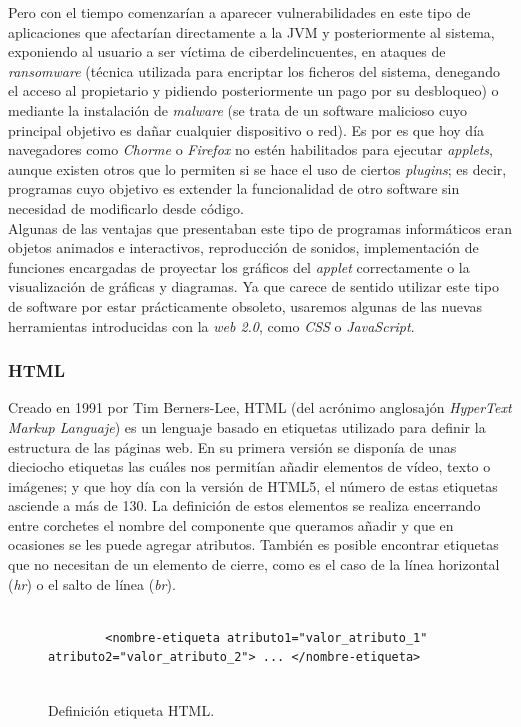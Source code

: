 \documentclass[../main.tex]{subfiles}
\begin{document}
    Pero con el tiempo comenzarían a aparecer vulnerabilidades en este tipo de aplicaciones que afectarían directamente a la JVM y posteriormente al sistema, exponiendo al usuario a ser víctima de ciberdelincuentes, en ataques de \textit{ransomware} (técnica utilizada para encriptar los ficheros del sistema, denegando el acceso al propietario y pidiendo posteriormente un pago por su desbloqueo) o mediante la instalación de \textit{malware} (se trata de un software malicioso cuyo principal objetivo es dañar cualquier dispositivo o red). Es por es que hoy día navegadores como \textit{Chorme} o \textit{Firefox} no estén habilitados para ejecutar \textit{applets}, aunque existen otros que lo permiten si se hace el uso de ciertos \textit{plugins}; es decir, programas cuyo objetivo es extender la funcionalidad de otro software sin necesidad de modificarlo desde código.\\ 
    
    
    Algunas de las ventajas que presentaban este tipo de programas informáticos eran objetos animados e interactivos, reproducción de sonidos, implementación de funciones encargadas de proyectar los gráficos del \textit{applet} correctamente o la visualización de gráficas y diagramas. Ya que carece de sentido utilizar este tipo de software por estar prácticamente obsoleto, usaremos algunas de las nuevas herramientas introducidas con la \textit{web 2.0}, como \textit{CSS} o \textit{JavaScript}.
    
    
    \subsubsection{HTML}
    Creado en 1991 por Tim Berners-Lee, HTML (del acrónimo anglosajón \textit{HyperText Markup Languaje}) es un lenguaje basado en etiquetas utilizado para definir la estructura de las páginas web. En su primera versión se disponía de unas dieciocho  etiquetas las cuáles nos permitían añadir elementos de vídeo, texto o imágenes; y que hoy día con la  versión de HTML5, el número de estas etiquetas asciende a más de 130. La definición de estos elementos se realiza encerrando entre corchetes el nombre del componente que queramos añadir y que en ocasiones se les puede agregar atributos. También es posible encontrar etiquetas que no necesitan de un elemento de cierre, como es el caso de la línea horizontal (\textit{hr}) o el salto de línea (\textit{br}). 
    
    
    \begin{figure}[!h]
        \centering
        \begin{verbatim}
        
        <nombre-etiqueta atributo1="valor_atributo_1" atributo2="valor_atributo_2"> ... </nombre-etiqueta>
        
        \end{verbatim}
        \caption{Definición etiqueta HTML.}
        \label{fig:definicion_etiqueta_html}
    \end{figure}
    
\end{document}
